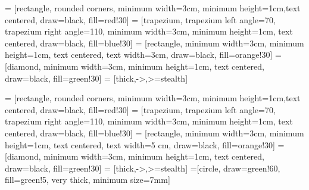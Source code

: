 \documentclass{article}
\begin{document}
 = [rectangle, rounded corners, minimum width=3cm, minimum height=1cm,text centered, draw=black, fill=red!30]
 = [trapezium, trapezium left angle=70, trapezium right angle=110, minimum width=3cm, minimum height=1cm, text centered, draw=black, fill=blue!30]
 = [rectangle, minimum width=3cm, minimum height=1cm, text centered, text width=3cm, draw=black, fill=orange!30]
 = [diamond, minimum width=3cm, minimum height=1cm, text centered, draw=black, fill=green!30]
 = [thick,->,>=stealth]



 = [rectangle, rounded corners, minimum width=3cm, minimum height=1cm,text centered, draw=black, fill=red!30]
 = [trapezium, trapezium left angle=70, trapezium right angle=110, minimum width=3cm, minimum height=1cm, text centered, draw=black, fill=blue!30]
 = [rectangle, minimum width=3cm, minimum height=1cm, text centered, text width=5 cm, draw=black, fill=orange!30]
 = [diamond, minimum width=3cm, minimum height=1cm, text centered, draw=black, fill=green!30]
 = [thick,->,>=stealth]
 =[circle, draw=green!60, fill=green!5, very thick, minimum size=7mm]
\end{document}
